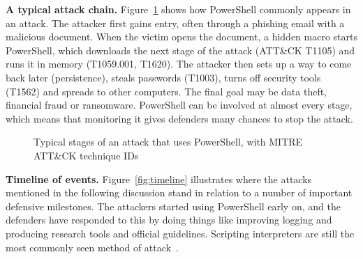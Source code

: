 \documentclass[12pt,a4paper]{article}
\newcommand{\attck}{ATT\&CK}
\newcommand{\head}[1]{\noindent\textbf{#1}\quad}
\begin{document}
\head{A typical attack chain.} Figure~\ref{fig:chain} shows how PowerShell commonly appears in an attack. The attacker first gains entry, often through a phishing email with a malicious document. When the victim opens the document, a hidden macro starts PowerShell, which downloads the next stage of the attack (\attck{} T1105) and runs it in memory (T1059.001, T1620). The attacker then sets up a way to come back later (persistence), steals passwords (T1003), turns off security tools (T1562) and spreads to other computers. The final goal may be data theft, financial fraud or ransomware. PowerShell can be involved at almost every stage, which means that monitoring it gives defenders many chances to stop the attack.

\begin{figure}[!htb]
\centering
{}
\caption{Typical stages of an attack that uses PowerShell, with MITRE \attck{} technique IDs}\label{fig:chain}
\end{figure}

\head{Timeline of events.} Figure~\ref{fig:timeline} illustrates where the attacks mentioned in the following discussion stand in relation to a number of important defensive milestones. The attackers started using PowerShell early on, and the defenders have responded to this by doing things like improving logging and producing research tools and official guidelines. Scripting interpreters are still the most commonly seen method of attack~\cite{redcanary2025}.
\end{document}
